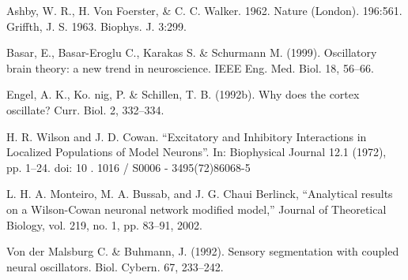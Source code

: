 \documentclass[12pt]{article}
\begin{document}
  
  
\clearpage
      
{}      
\begin{thebibliography}{9}

  Ashby, W. R., H. Von Foerster, \& C. C. Walker. 1962. Nature (London). 196:561.
  Griffth, J. S. 1963. Biophys. J. 3:299.
  
  Basar, E., Basar-Eroglu C., Karakas S. \& Schurmann M. (1999). Oscillatory brain theory: a new trend in neuroscience. IEEE Eng. Med. Biol. 18, 56–66.

  Engel, A. K., Ko. nig, P. \& Schillen, T. B. (1992b). Why does the cortex oscillate? Curr. Biol. 2, 332–334.

  H. R. Wilson and J. D. Cowan. “Excitatory and Inhibitory Interactions in Localized Populations of Model Neurons”. In: Biophysical Journal 12.1 (1972), pp. 1–24. doi: 10 . 1016 / S0006 - 3495(72)86068-5
  
  L. H. A. Monteiro, M. A. Bussab, and J. G. Chaui Berlinck, “Analytical results on a Wilson-Cowan neuronal network modified model,” Journal of Theoretical Biology, vol. 219, no. 1, pp. 83–91, 2002.

  
  Von der Malsburg C. \& Buhmann, J. (1992). Sensory segmentation with coupled neural oscillators. Biol. Cybern. 67, 233–242.
\end{thebibliography}
\end{document}
